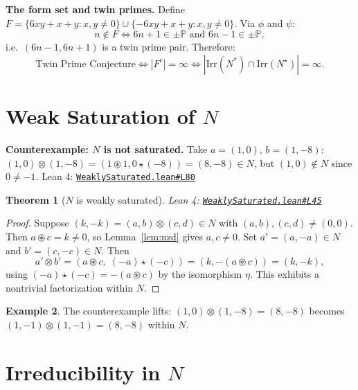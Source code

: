 \documentclass[11pt,a4paper]{amsart}
\theoremstyle{plain}
\newtheorem{theorem}{Theorem}[section]
\theoremstyle{definition}
\newtheorem{example}[theorem]{Example}
\theoremstyle{remark}
\newcommand{\mstar}{\mathbin{\circledast}}  %
\newcommand{\sstar}{\mathbin{\star}}        %
\newcommand{\tens}{\mathbin{\otimes}}       %
\newcommand{\PP}{\mathbb{P}}               %
\newcommand{\Irr}{\mathrm{Irr}}
\newcommand{\Nstar}{N^*}
\newcommand{\Nsstar}{N^\star}
\newcommand{\phii}{\phi}                   %
\newcommand{\psii}{\psi}                   %
\newcommand{\etaa}{\eta}                   %
\newcommand{\GH}{https://github.com/FruitfulApproach/Lean4TPC/blob/main}
\begin{document}
\noindent\textbf{The form set and twin primes.}\quad
Define $F = \{6xy+x+y : x,y \neq 0\} \cup \{-6xy+x+y : x,y \neq 0\}$.
Via $\phii$ and $\psii$:
\[
n \notin F \iff 6n+1 \in \pm\PP \text{ and } 6n-1 \in \pm\PP,
\]
i.e.\ $(6n-1, 6n+1)$ is a twin prime pair.  Therefore:
\[
\text{Twin Prime Conjecture} \iff |F^c| = \infty \iff |\Irr(\Nstar) \cap \Irr(\Nsstar)| = \infty.
\]

\section{Weak Saturation of $N$}

\noindent\textbf{Counterexample: $N$ is not saturated.}\quad
Take $a=(1,0)$, $b=(1,-8)$:
$(1,0) \tens (1,-8) = (1 \mstar 1, 0 \sstar (-8)) = (8,-8) \in N$,
but $(1,0) \notin N$ since $0 \neq -1$.
\textnormal{Lean 4:} \href{\GH/TPC/WeaklySaturated.lean\#L80}{\texttt{WeaklySaturated.lean\#L80}}

\begin{theorem}[$N$ is weakly saturated]
\label{thm:ws}
\textnormal{Lean 4:} \href{\GH/TPC/WeaklySaturated.lean\#L45}{\texttt{WeaklySaturated.lean\#L45}}
\end{theorem}

\begin{proof}
Suppose $(k,-k) = (a,b) \tens (c,d) \in N$ with $(a,b),(c,d) \neq (0,0)$.
Then $a \mstar c = k \neq 0$, so Lemma~\ref{lem:nzd} gives $a, c \neq 0$.
Set $a' = (a,-a) \in N$ and $b' = (c,-c) \in N$.  Then
\[
a' \tens b' = (a \mstar c,\; (-a) \sstar (-c)) = (k, -(a \mstar c)) = (k,-k),
\]
using $(-a) \sstar (-c) = -(a \mstar c)$ by the isomorphism $\etaa$.
This exhibits a nontrivial factorization within $N$.
\end{proof}

\begin{example}
The counterexample lifts: $(1,0) \tens (1,-8) = (8,-8)$ becomes
$(1,-1) \tens (1,-1) = (8,-8)$ within $N$.
\end{example}

\section{Irreducibility in $N$}
\end{document}
